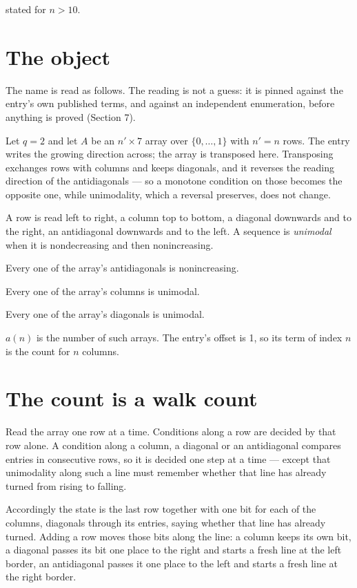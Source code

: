 \documentclass[11pt]{article}
\theoremstyle{definition}
\begin{document}
stated for $n > 10$.

\section{The object}

The name is read as follows. The reading is not a guess: it is pinned against the entry's own published terms, and against an independent enumeration, before anything is proved (Section 7).

Let $q = 2$ and let $A$ be an $n' \times 7$ array over $\{0,\dots,1\}$ with $n' = n$ rows. The entry writes the growing direction across; the array is transposed here. Transposing exchanges rows with columns and keeps diagonals, and it reverses the reading direction of the antidiagonals --- so a monotone condition on those becomes the opposite one, while unimodality, which a reversal preserves, does not change.

A row is read left to right, a column top to bottom, a diagonal downwards and to the right, an antidiagonal downwards and to the left. A sequence is {\itshape unimodal} when it is nondecreasing and then nonincreasing.

Every one of the array's antidiagonals is nonincreasing.

Every one of the array's columns is unimodal.

Every one of the array's diagonals is unimodal.

$a(n)$ is the number of such arrays. The entry's offset is 1, so its term of index $n$ is the count for $n$ columns.

\section{The count is a walk count}

Read the array one row at a time. Conditions along a row are decided by that row alone. A condition along a column, a diagonal or an antidiagonal compares entries in consecutive rows, so it is decided one step at a time --- except that unimodality along such a line must remember whether that line has already turned from rising to falling.

Accordingly the state is the last row together with one bit for each of the columns, diagonals through its entries, saying whether that line has already turned. Adding a row moves those bits along the line: a column keeps its own bit, a diagonal passes its bit one place to the right and starts a fresh line at the left border, an antidiagonal passes it one place to the left and starts a fresh line at the right border.
\end{document}

